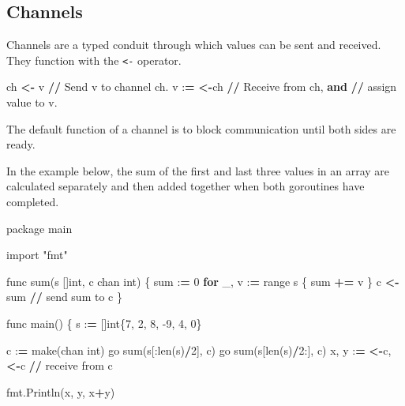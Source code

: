 \documentclass[]{book}
\newenvironment{Shaded}{\begin{snugshade}}{\end{snugshade}}
\newcommand{\BuiltInTok}[1]{#1}
\newcommand{\ControlFlowTok}[1]{\textcolor[rgb]{0.13,0.29,0.53}{\textbf{#1}}}
\newcommand{\DecValTok}[1]{\textcolor[rgb]{0.00,0.00,0.81}{#1}}
\newcommand{\ImportTok}[1]{#1}
\newcommand{\KeywordTok}[1]{\textcolor[rgb]{0.13,0.29,0.53}{\textbf{#1}}}
\newcommand{\NormalTok}[1]{#1}
\newcommand{\OperatorTok}[1]{\textcolor[rgb]{0.81,0.36,0.00}{\textbf{#1}}}
\newcommand{\StringTok}[1]{\textcolor[rgb]{0.31,0.60,0.02}{#1}}
\begin{document}
\hypertarget{channels}{%
\subsection{Channels}\label{channels}}

Channels are a typed conduit through which values can be sent and received. They function with the \texttt{\textless{}-} operator.

\begin{Shaded}
\begin{Highlighting}[]
\NormalTok{ch }\OperatorTok{<-}\NormalTok{ v    }\OperatorTok{//}\NormalTok{ Send v to channel ch.}
\NormalTok{v :}\OperatorTok{=} \OperatorTok{<-}\NormalTok{ch  }\OperatorTok{//}\NormalTok{ Receive }\ImportTok{from}\NormalTok{ ch, }\KeywordTok{and}
           \OperatorTok{//}\NormalTok{ assign value to v.}
\end{Highlighting}
\end{Shaded}

The default function of a channel is to block communication until both sides are ready.

In the example below, the sum of the first and last three values in an array are calculated separately and then added together when both goroutines have completed.

\begin{Shaded}
\begin{Highlighting}[]
\NormalTok{package main}

\ImportTok{import} \StringTok{"fmt"}

\NormalTok{func }\BuiltInTok{sum}\NormalTok{(s []}\BuiltInTok{int}\NormalTok{, c chan }\BuiltInTok{int}\NormalTok{) \{}
    \BuiltInTok{sum}\NormalTok{ :}\OperatorTok{=} \DecValTok{0}
    \ControlFlowTok{for}\NormalTok{ _, v :}\OperatorTok{=} \BuiltInTok{range}\NormalTok{ s \{}
        \BuiltInTok{sum} \OperatorTok{+=}\NormalTok{ v}
\NormalTok{    \}}
\NormalTok{    c }\OperatorTok{<-} \BuiltInTok{sum} \OperatorTok{//}\NormalTok{ send }\BuiltInTok{sum}\NormalTok{ to c}
\NormalTok{\}}

\NormalTok{func main() \{}
\NormalTok{    s :}\OperatorTok{=}\NormalTok{ []}\BuiltInTok{int}\NormalTok{\{}\DecValTok{7}\NormalTok{, }\DecValTok{2}\NormalTok{, }\DecValTok{8}\NormalTok{, }\DecValTok{-9}\NormalTok{, }\DecValTok{4}\NormalTok{, }\DecValTok{0}\NormalTok{\}}

\NormalTok{    c :}\OperatorTok{=}\NormalTok{ make(chan }\BuiltInTok{int}\NormalTok{)}
\NormalTok{    go }\BuiltInTok{sum}\NormalTok{(s[:}\BuiltInTok{len}\NormalTok{(s)}\OperatorTok{/}\DecValTok{2}\NormalTok{], c)}
\NormalTok{    go }\BuiltInTok{sum}\NormalTok{(s[}\BuiltInTok{len}\NormalTok{(s)}\OperatorTok{/}\DecValTok{2}\NormalTok{:], c)}
\NormalTok{    x, y :}\OperatorTok{=} \OperatorTok{<-}\NormalTok{c, }\OperatorTok{<-}\NormalTok{c }\OperatorTok{//}\NormalTok{ receive }\ImportTok{from}\NormalTok{ c}

\NormalTok{    fmt.Println(x, y, x}\OperatorTok{+}\NormalTok{y)}
\end{Highlighting}
\end{Shaded}
\end{document}

